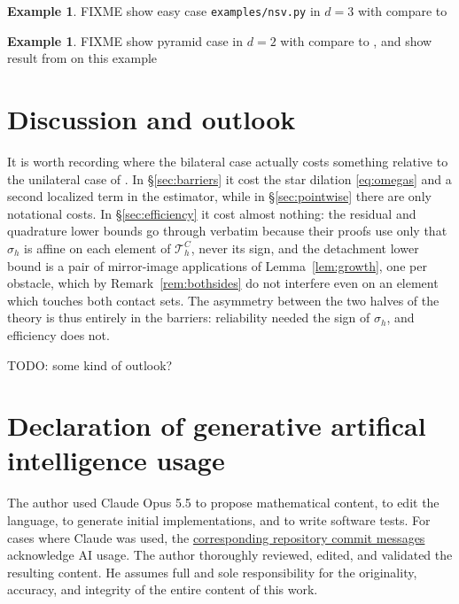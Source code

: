 \documentclass[12pt]{amsart}
\numberwithin{equation}{section}
\theoremstyle{plain}
\theoremstyle{definition}
\newtheorem{example}[theorem]{Example}
\theoremstyle{remark}
\newcommand{\Th}{\mathcal{T}_h}
\newcommand{\ThC}{\Th^C}
\begin{document}
\begin{example} \label{ex:easyunilateral}
FIXME show easy case \texttt{examples/nsv.py} in $d=3$ with compare to \cite[Figure 7.1, lower]{NSV03}
\end{example}

\begin{example} \label{ex:pyramidunilateral}
FIXME show pyramid case in $d=2$ with compare to \cite[Figure 7.6, left]{NSV03}, and show result from \cite{NSV05} on this example
\end{example}

\section{Discussion and outlook}
\label{sec:discuss}

It is worth recording where the bilateral case actually costs something relative to the unilateral case of \cite{NSV03}.  In \S \ref{sec:barriers} it cost the star dilation \eqref{eq:omegas} and a second localized term in the estimator, while in \S \ref{sec:pointwise} there are only notational costs.  In \S \ref{sec:efficiency} it cost almost nothing: the residual and quadrature lower bounds go through verbatim because their proofs use only that $\sigma_h$ is affine on each element of $\ThC$, never its sign, and the detachment lower bound is a pair of mirror-image applications of Lemma~\ref{lem:growth}, one per obstacle, which by Remark~\ref{rem:bothsides} do not interfere even on an element which touches both contact sets.  The asymmetry between the two halves of the theory is thus entirely in the barriers: reliability needed the sign of $\sigma_h$, and efficiency does not.

TODO: some kind of outlook?


\section{Declaration of generative artifical intelligence usage}  \label{sec:ai}

The author used Claude Opus 5.5 to propose mathematical content, to edit the language, to generate initial implementations, and to write software tests.  For cases where Claude was used, the \href{https://github.com/StefanoFochesatto/viamr}{corresponding repository commit messages} acknowledge AI usage.  The author thoroughly reviewed, edited, and validated the resulting content.  He assumes full and sole responsibility for the originality, accuracy, and integrity of the entire content of this work.



\end{document}
